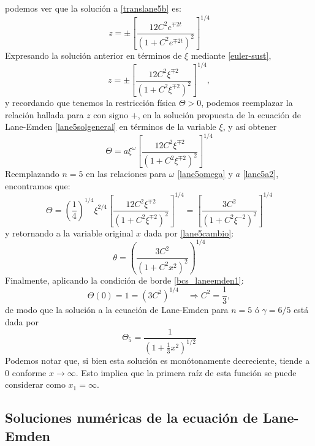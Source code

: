 podemos ver que la solución a \eqref{translane5b} es:
\begin{equation}
 z=\pm\left[\frac{12C^2e^{\mp 2t}}{(1+C^2e^{\mp 2t})^2}\right]^{1/4}
\end{equation}
Expresando la solución anterior en términos de $\xi$ mediante \eqref{euler-sust},
\begin{equation}
 z=\pm\left[\frac{12C^2\xi^{\mp2}}{(1+C^2\xi^{\mp2})^2}\right]^{1/4},
\end{equation}
y recordando que tenemos la restricción física $\Theta>0$, podemos reemplazar la relación hallada para $z$ con signo $+$, en la solución propuesta de la ecuación de Lane-Emden \eqref{lane5solgeneral} en términos de la variable $\xi$, y así obtener
\begin{equation}
 \Theta=a\xi^{\omega}\left[\frac{12C^2\xi^{\mp2}}{(1+C^2\xi^{\mp2})^2}\right]^{1/4}
\end{equation}
Reemplazando $n=5$ en las relaciones para $\omega$ \eqref{lane5omega} y $a$ \eqref{lane5a2}, encontramos que:
\begin{equation}
\Theta=\left(\frac{1}{4}\right)^{1/4}\xi^{2/4} \left[\frac{12C^2\xi^{\mp2}}{(1+C^2\xi^{\mp2})^2}\right]^{1/4}=\left[ \frac{3C^2}{(1+C^2\xi^{-2})^2}\right]^{1/4}
\end{equation}
y retornando a la variable original $x$ dada por \eqref{lane5cambio}:
\begin{equation}
\theta=\left(\frac{3C^2}{(1+C^2x^2)^2}\right)^{1/4}
\end{equation}
Finalmente, aplicando la condición de borde \eqref{bcs_laneemden1}:
\begin{equation}
 \Theta(0)=1=(3C^2)^{1/4}\quad\Rightarrow C^2=\frac{1}{3},
\end{equation}
de modo que la solución a la ecuación de Lane-Emden para $n=5$ ó $\gamma=6/5$ está dada por
\begin{equation}\label{lane5}
\boxed{\Theta_5=\frac{1}{\left(1+\frac{1}{3}x^2\right)^{1/2}}}
\end{equation}
Podemos notar que, si bien esta solución es monótonamente decreciente, tiende a $0$ conforme $x\to\infty$. Esto implica que la primera raíz de esta función se puede considerar como $x_1=\infty$.

\subsection{Soluciones numéricas de la ecuación de Lane-Emden}\label{sec:lane-numerico}

